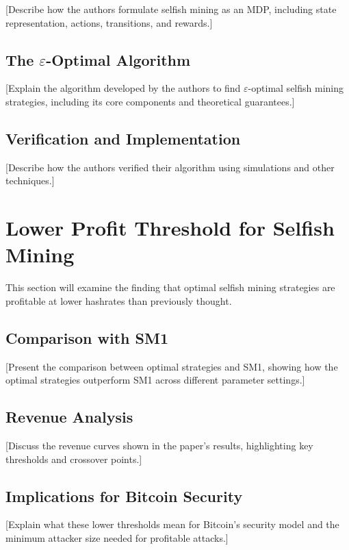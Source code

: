 \documentclass[conference]{IEEEtran}
\begin{document}
[Describe how the authors formulate selfish mining as an MDP, including state representation, actions, transitions, and rewards.]

\subsection{The $\varepsilon$-Optimal Algorithm}

[Explain the algorithm developed by the authors to find $\varepsilon$-optimal selfish mining strategies, including its core components and theoretical guarantees.]

\subsection{Verification and Implementation}

[Describe how the authors verified their algorithm using simulations and other techniques.]

\section{Lower Profit Threshold for Selfish Mining}

This section will examine the finding that optimal selfish mining strategies are profitable at lower hashrates than previously thought.

\subsection{Comparison with SM1}

[Present the comparison between optimal strategies and SM1, showing how the optimal strategies outperform SM1 across different parameter settings.]

\subsection{Revenue Analysis}

[Discuss the revenue curves shown in the paper's results, highlighting key thresholds and crossover points.]

\subsection{Implications for Bitcoin Security}

[Explain what these lower thresholds mean for Bitcoin's security model and the minimum attacker size needed for profitable attacks.]
\end{document}
